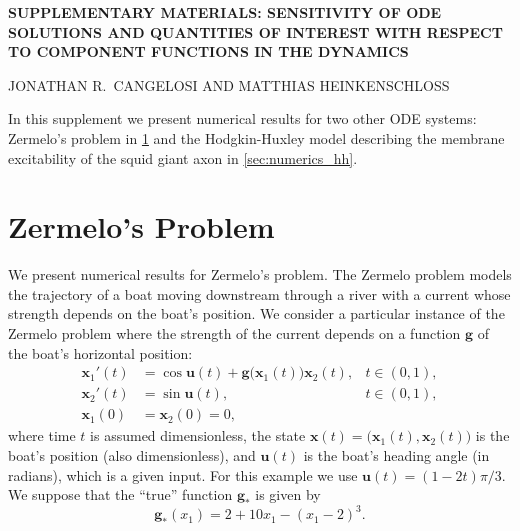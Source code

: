 \documentclass[onefignum,onetabnum]{siamart220329}
\numberwithin{equation}{section}
\newcommand{\bg}{\ensuremath{\mathbf{g}}} %
\newcommand{\bu}{\ensuremath{\mathbf{u}}} %
\newcommand{\bx}{\ensuremath{\mathbf{x}}} %
\begin{document}
\newpage

\setcounter{section}{0}
\renewcommand\thesection{SM\arabic{section}}

\setcounter{figure}{0}
%

\setcounter{page}{1}
\renewcommand{\thepage}{SM.\arabic{page}}


\begin{center}
{\bf SUPPLEMENTARY MATERIALS: SENSITIVITY OF ODE SOLUTIONS AND QUANTITIES OF
INTEREST WITH RESPECT TO COMPONENT FUNCTIONS IN THE DYNAMICS } 

\medskip
JONATHAN R.\ CANGELOSI AND MATTHIAS HEINKENSCHLOSS 

\medskip
\end{center}



In this supplement we present numerical results for two other ODE systems:
Zermelo's problem in \cref{sec:numerics_zermelo} and the 
Hodgkin-Huxley model describing the membrane excitability of the squid giant axon 
in \cref{sec:numerics_hh}.


% 
\section{Zermelo's Problem} \label{sec:numerics_zermelo}
We present numerical results for Zermelo's problem. 
The Zermelo problem models the trajectory of a boat moving downstream through a river with a current whose strength depends on the boat's position. 
We consider a particular instance of the Zermelo problem where the strength of the current depends on a function $\bg$ of the boat's horizontal position:
\begin{equation} \label{eq:numerics_zermelo:zermelo_ODE}
\begin{aligned}
	\bx_1'(t) &= \cos \bu(t) + \bg\big(\bx_1(t)\big) \bx_2(t), & t \in (0, 1), \\
	\bx_2'(t) &= \sin  \bu(t), & t \in (0, 1), \\
	\bx_1(0) &= \bx_2(0) = 0,
\end{aligned}
\end{equation}
where time $t$ is assumed dimensionless, the state $\bx(t) = \big(\bx_1(t), \bx_2(t)\big)$ is the boat's position (also dimensionless), and $\bu(t)$ is the boat's heading angle (in radians), which is a given input.
For this example we use $\bu(t) = (1 - 2t) \pi / 3$.
We suppose that the ``true'' function $\bg_*$ is given by
\[
	\bg_*(x_1) = 2 + 10x_1 - (x_1 - 2)^3.
\]
\end{document}
